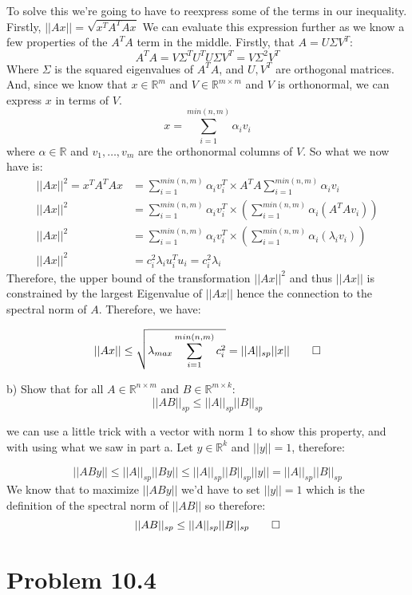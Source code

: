 \documentclass[12pt,twoside]{article}
\newcommand{\R}{\mathbb{R}}
\begin{document}
To solve this we're going to have to reexpress some of the terms in our inequality. Firstly, $||Ax|| = \sqrt{x^TA^TAx}$ We can evaluate this expression further as we know a few properties of the $A^TA$ term in the middle. Firstly, that $A = U\Sigma V^T$:
$$
    A^TA = V\Sigma ^T U^T U \Sigma V^T = V\Sigma ^2 V^T
$$
Where $\Sigma$ is the squared eigenvalues of $A^TA$, and $U,V^T$ are orthogonal matrices. And, since we know that $x \in \R^m$ and $V \in \R^{m \times m}$ and $V$ is orthonormal, we can express $x$ in terms of $V$.
$$
x = \sum_{i=1}^{min(n,m)} \alpha_i v_i
$$
where $\alpha \in \R$ and $v_1, \dots, v_m$ are the orthonormal columns of $V$. So what we now have is:
\begin{equation}
    \begin{split}
          ||Ax||^2 = x^TA^TAx &= \sum_{i=1}^{min(n,m)} \alpha_i v_i^T \times A^TA \sum_{i=1}^{min(n,m)} \alpha_i v_i \\
          ||Ax||^2 &= \sum_{i=1}^{min(n,m)} \alpha_i v_i^T \times (\sum_{i=1}^{min(n,m)} \alpha_i (A^TAv_i)) \\
          ||Ax||^2 &= \sum_{i=1}^{min(n,m)} \alpha_i v_i^T \times (\sum_{i=1}^{min(n,m)} \alpha_i (\lambda_i v_i)) \\
          ||Ax||^2 &= c_i^2 \lambda_i u_i^Tu_i = c_i^2 \lambda_i 
    \end{split}
\end{equation}
Therefore, the upper bound of the transformation $||Ax||^2$ and thus $||Ax||$ is constrained by the largest Eigenvalue of $||Ax||$ hence the connection to the spectral norm of $A$. Therefore, we have:

$$
    ||Ax|| \leq \sqrt{\lambda_{max} \sum_{i=1}^{min(n,m)} c_i^2} = ||A||_{sp} || x|| \qed
$$




b) Show that for all $A \in \R^{n \times m}$ and $B \in \R^{m\times k}$: 
$$
  ||AB||_{sp} \leq ||A||_{sp}||B||_{sp}
$$

we can use a little trick with a vector with norm 1 to show this property, and with using what we saw in part a. Let $y \in \R^k$ and $||y|| = 1$, therefore:

$$
    ||ABy|| \leq ||A||_{sp} ||By|| \leq ||A||_{sp} ||B||_{sp}||y|| = ||A||_{sp} ||B||_{sp} 
$$
We know that to maximize $||ABy||$ we'd have to set $||y||=1$ which is the definition of the spectral norm of $||AB||$ so therefore:
$$
    ||AB||_{sp} \leq ||A||_{sp}||B||_{sp} \qed
$$


\section{Problem 10.4}

\end{document}
